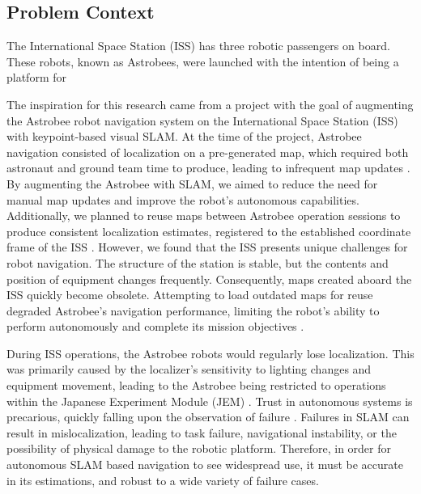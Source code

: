 \subsection{Problem Context}


The International Space Station (ISS) has three robotic passengers on board. These robots, known as Astrobees, were launched with the intention of being a platform for 

The inspiration for this research came from a project with the goal of augmenting the Astrobee robot navigation system on the International Space Station (ISS) with keypoint-based visual SLAM. At the time of the project, Astrobee navigation consisted of localization on a pre-generated map, which required both astronaut and ground team time to produce, leading to infrequent map updates \cite{soussanAstroLocEfficientRobust2022}. By augmenting the Astrobee with SLAM, we aimed to reduce the need for manual map updates and improve the robot's autonomous capabilities. Additionally, we planned to reuse maps between Astrobee operation sessions to produce consistent localization estimates, registered to the established coordinate frame of the ISS \cite{zuralesCollaborativeSensingMapping2024}. However, we found that the ISS presents unique challenges for robot navigation. The structure of the station is stable, but the contents and position of equipment changes frequently. Consequently, maps created aboard the ISS quickly become obsolete. Attempting to load outdated maps for reuse degraded Astrobee's navigation performance, limiting the robot's ability to perform autonomously and complete its mission objectives \cite{carlinoLessonsLearnedAstrobee}.


During ISS operations, the Astrobee robots would regularly lose localization. This was primarily caused by the localizer's sensitivity to lighting changes and equipment movement, leading to the Astrobee being restricted to operations within the Japanese Experiment Module (JEM) \cite{carlinoLessonsLearnedAstrobee}. Trust in autonomous systems is precarious, quickly falling upon the observation of failure \cite{robinetteEffectRobotPerformance2017}. Failures in SLAM can result in mislocalization, leading to task failure, navigational instability, or the possibility of physical damage to the robotic platform\cite{nahavandiComprehensiveReviewAutonomous2025a}. Therefore, in order for autonomous SLAM based navigation to see widespread use, it must be accurate in its estimations, and robust to a wide variety of failure cases.

